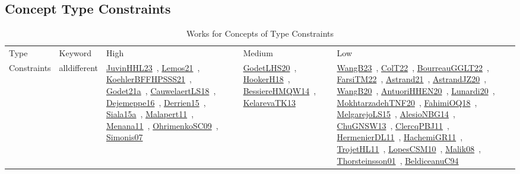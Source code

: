 \clearpage
\subsection{Concept Type Constraints}
\label{sec:Constraints}
{\scriptsize
\begin{longtable}{lp{3cm}>{\raggedright\arraybackslash}p{6cm}>{\raggedright\arraybackslash}p{6cm}>{\raggedright\arraybackslash}p{8cm}}
\rowcolor{white}\caption{Works for Concepts of Type Constraints}\\ \toprule
\rowcolor{white}Type & Keyword & High & Medium & Low\\ \midrule\endhead
\bottomrule
\endfoot
Constraints & alldifferent & \href{works/JuvinHHL23.pdf}{JuvinHHL23}~\cite{JuvinHHL23}, \href{works/Lemos21.pdf}{Lemos21}~\cite{Lemos21}, \href{works/KoehlerBFFHPSSS21.pdf}{KoehlerBFFHPSSS21}~\cite{KoehlerBFFHPSSS21}, \href{works/Godet21a.pdf}{Godet21a}~\cite{Godet21a}, \href{works/CauwelaertLS18.pdf}{CauwelaertLS18}~\cite{CauwelaertLS18}, \href{works/Dejemeppe16.pdf}{Dejemeppe16}~\cite{Dejemeppe16}, \href{works/Derrien15.pdf}{Derrien15}~\cite{Derrien15}, \href{works/Siala15a.pdf}{Siala15a}~\cite{Siala15a}, \href{works/Malapert11.pdf}{Malapert11}~\cite{Malapert11}, \href{works/Menana11.pdf}{Menana11}~\cite{Menana11}, \href{works/OhrimenkoSC09.pdf}{OhrimenkoSC09}~\cite{OhrimenkoSC09}, \href{works/Simonis07.pdf}{Simonis07}~\cite{Simonis07} & \href{works/GodetLHS20.pdf}{GodetLHS20}~\cite{GodetLHS20}, \href{works/HookerH18.pdf}{HookerH18}~\cite{HookerH18}, \href{works/BessiereHMQW14.pdf}{BessiereHMQW14}~\cite{BessiereHMQW14}, \href{works/KelarevaTK13.pdf}{KelarevaTK13}~\cite{KelarevaTK13} & \href{works/WangB23.pdf}{WangB23}~\cite{WangB23}, \href{works/ColT22.pdf}{ColT22}~\cite{ColT22}, \href{works/BourreauGGLT22.pdf}{BourreauGGLT22}~\cite{BourreauGGLT22}, \href{works/FarsiTM22.pdf}{FarsiTM22}~\cite{FarsiTM22}, \href{works/Astrand21.pdf}{Astrand21}~\cite{Astrand21}, \href{works/AstrandJZ20.pdf}{AstrandJZ20}~\cite{AstrandJZ20}, \href{works/WangB20.pdf}{WangB20}~\cite{WangB20}, \href{works/AntuoriHHEN20.pdf}{AntuoriHHEN20}~\cite{AntuoriHHEN20}, \href{works/Lunardi20.pdf}{Lunardi20}~\cite{Lunardi20}, \href{works/MokhtarzadehTNF20.pdf}{MokhtarzadehTNF20}~\cite{MokhtarzadehTNF20}, \href{works/FahimiOQ18.pdf}{FahimiOQ18}~\cite{FahimiOQ18}, \href{works/MelgarejoLS15.pdf}{MelgarejoLS15}~\cite{MelgarejoLS15}, \href{works/AlesioNBG14.pdf}{AlesioNBG14}~\cite{AlesioNBG14}, \href{works/ChuGNSW13.pdf}{ChuGNSW13}~\cite{ChuGNSW13}, \href{works/ClercqPBJ11.pdf}{ClercqPBJ11}~\cite{ClercqPBJ11}, \href{works/HermenierDL11.pdf}{HermenierDL11}~\cite{HermenierDL11}, \href{works/HachemiGR11.pdf}{HachemiGR11}~\cite{HachemiGR11}, \href{works/TrojetHL11.pdf}{TrojetHL11}~\cite{TrojetHL11}, \href{works/LopesCSM10.pdf}{LopesCSM10}~\cite{LopesCSM10}, \href{works/Malik08.pdf}{Malik08}~\cite{Malik08}, \href{works/Thorsteinsson01.pdf}{Thorsteinsson01}~\cite{Thorsteinsson01}, \href{works/BeldiceanuC94.pdf}{BeldiceanuC94}~\cite{BeldiceanuC94}\\

\end{longtable}}
